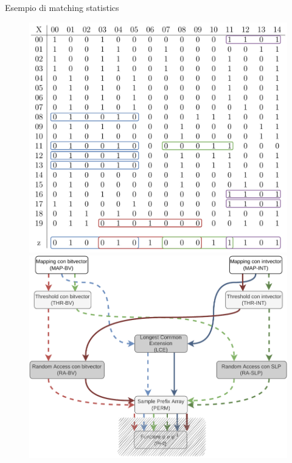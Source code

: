 \documentclass[]{beamer}
\begin{document}
\begin{frame}{Esempio di matching statistics}
  \vspace{-0.3cm}
 \begin{figure}[H]
    \centering
    \includegraphics[scale = 0.21, valign=t]{img/pbwtmatch.pdf}
    \includegraphics[scale = 0.3, valign=t]{img/mini_ms2.pdf}
  \end{figure}
  \vspace{-0.5cm}
  \begin{table}[H]
    \scriptsize
    \centering

\end{table}
\end{frame}
\end{document}
